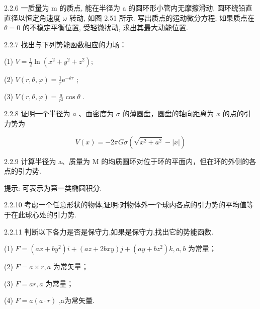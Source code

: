 \begin{problem}{2.2.6}
一质量为 m 的质点, 能在半径为 a 的圆环形小管内无摩擦滑动, 圆环绕铅直直径以恒定角速度 $\omega$ 转动, 如图 2.51 所示. 写出质点的运动微分方程; 如果质点在 $\theta=0$ 的不稳定平衡位置, 受轻微扰动, 求出其最大动能位置.
\begin{center}

\end{center}
\end{problem}
\clearpage


\begin{problem}{2.2.7}
找出与下列势能函数相应的力场：

(1) $V = \frac{1}{2}\ln (x^2 +y^2 +z^2);$ 

(2) $V(r, \theta, \varphi) = \frac{1}{r} \mathrm{e}^{-kr}$ ; 

(3) $V(r, \theta, \varphi) = \frac{a}{r^2} \cos \theta$ .
\end{problem}
\clearpage


\begin{problem}{2.2.8}
证明一个半径为 $a$ 、面密度为 $\sigma$ 的薄圆盘，圆盘的轴向距离为 $x$ 的点的引力势为

\[
V (x) = - 2 \pi G \sigma (\sqrt {x ^ {2} + a ^ {2}} - | x |)
\]
\end{problem}
\clearpage


\begin{problem}{2.2.9}
计算半径为 a、质量为 M 的均质圆环对位于环的平面内，但在环的外侧的各点的引力势.

提示: 可表示为第一类椭圆积分.
\begin{center}

\end{center}
\end{problem}
\clearpage


\begin{problem}{2.2.10}
考虑一个任意形状的物体,证明:对物体外一个球内各点的引力势的平均值等于在此球心处的引力势.
\end{problem}
\clearpage


\begin{problem}{2.2.11}
判断以下各力是否是保守力,如果是保守力,找出它的势能函数.

(1) $F=(ax+by^{2})i+(az+2bxy)j+(ay+bz^{2})k,a,b$ 为常量；

(2) $F=a\times r,a$ 为常矢量；

(3) $F = ar, a$ 为常量；

(4) $F=a(a\cdot r)$ ,a为常矢量.
\end{problem}
\clearpage


